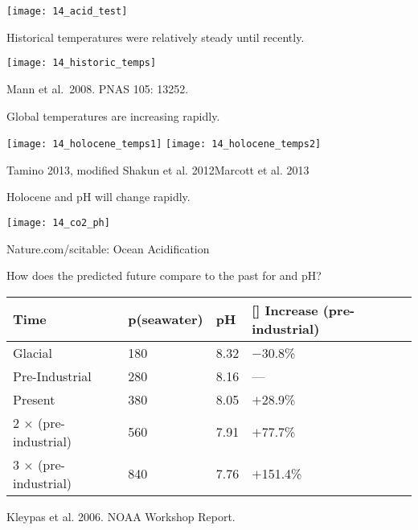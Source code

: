\documentclass[t,handout]{beamer}  %
\begin{document}

{
\begin{frame}
  \texttt{[image: 14\_acid\_test]}
\end{frame}
}
\begin{frame}[t]{Historical temperatures were relatively steady until recently.}

	\vspace{-\baselineskip}

	{\centering
	\texttt{[image: 14\_historic\_temps]}\par}
	
	\vfilll
	
	\tiny \hfill Mann et al.~2008. PNAS 105: 13252.  
	
\end{frame}
%
\begin{frame}[t]{Global temperatures are increasing rapidly.}
	
	\texttt{[image: 14\_holocene\_temps1]}
	\hfill
	\texttt{[image: 14\_holocene\_temps2]}

	\vfilll

	\tiny Tamino 2013, modified Shakun et al. 2012\hfill Marcott et al. 2013
	
\end{frame}
%
\begin{frame}[b]{Holocene  and pH will change rapidly.}

	\texttt{[image: 14\_co2\_ph]}
	
	\vfilll

	\hfill\tiny Nature.com/scitable: Ocean Acidification
	
\end{frame}
%
\begin{frame}[t]{How does the predicted future compare to the past for  and pH?}

	{\centering\liningnums\begin{tabular}{@{}L{25mm}C{20mm}C{10mm}R{25mm}@{}}
		\toprule
		Time	&	p\newline (seawater) &	pH	&	[] Increase (pre-industrial) \\
		\midrule
		Glacial	&	180	& 8.32	&	$-$30.8\% \\[1ex]
		Pre-Industrial	&	280	&	8.16	&	— \\[1ex]
		Present	&	380	&	8.05	&	$+$28.9\% \\[1ex]
		2 $\times$  (pre-industrial)	&	560	&	7.91	&	$+$77.7\% \\[1ex]
		3 $\times$  (pre-industrial) & 	840	& 7.76 & $+$151.4\% \\[1ex]
		\bottomrule
	\end{tabular}\par
	}

	\hangpara {} 
	\vfilll

	\hfill \tiny Kleypas et al. 2006. NOAA Workshop Report.

\end{frame}
%
\end{document}
